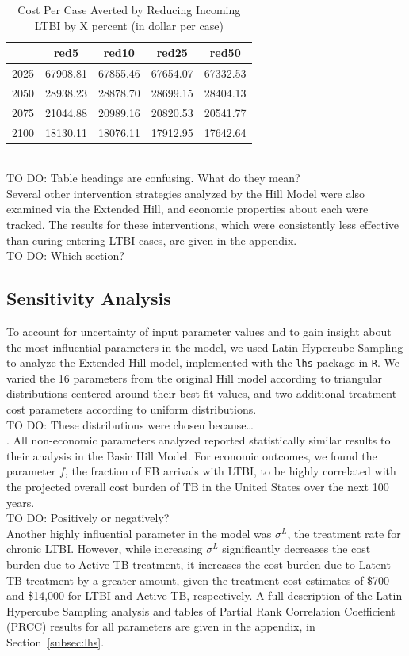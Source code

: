 \documentclass{amsart}
\newcommand{\TODO}[1]{\hfill\\{\huge \color{red} TO DO:} #1 \hfill \\}
\begin{document}
\begin{table}
\centering
\begin{tabular}{|r|cccc|} \hline
       & red5     & red10    & red25    & red50    \\ \hline
  2025 & 67908.81 & 67855.46 & 67654.07 & 67332.53 \\ 
  2050 & 28938.23 & 28878.70 & 28699.15 & 28404.13 \\ 
  2075 & 21044.88 & 20989.16 & 20820.53 & 20541.77 \\ 
  2100 & 18130.11 & 18076.11 & 17912.95 & 17642.64 \\ \hline
\end{tabular}
\caption{Cost Per Case Averted by Reducing Incoming LTBI by X percent (in dollar per case)} 
\label{tab:cpcaArt}
\end{table}
\TODO{Table headings are confusing. What do they mean?}

Several other intervention strategies analyzed by the Hill Model were also
examined via the Extended Hill, and economic properties about each were tracked.
The results for these interventions, which were consistently less effective than
curing entering LTBI cases, are given in the appendix. 
\TODO{Which section?}

\subsection{Sensitivity Analysis}
To account for uncertainty of input parameter values and to gain insight about
the most influential parameters in the model, we used Latin Hypercube Sampling
to analyze the Extended Hill model, implemented with the \texttt{lhs} package in
\texttt{R}.  We varied the 16 parameters from the original Hill model according
to triangular distributions centered around their best-fit values, and two
additional treatment cost parameters according to uniform distributions.
\TODO{These distributions were chosen because\ldots}. 
All non-economic parameters analyzed reported statistically similar results to
their analysis in the Basic Hill Model. For economic outcomes, we found the
parameter $f$, the fraction of FB arrivals with LTBI, to be highly correlated
with the projected overall cost burden of TB in the United States over the next
100 years.
\TODO{Positively or negatively?}
Another highly influential parameter in the model was $\sigma^{L}$,
the treatment rate for chronic LTBI.  However, while increasing $\sigma^{L}$
significantly decreases the cost burden due to Active TB treatment, it increases
the cost burden due to Latent TB treatment by a greater amount, given the
treatment cost estimates of \$700 and \$14,000 for LTBI and Active TB,
respectively.  A full description of the Latin Hypercube Sampling analysis and
tables of Partial Rank Correlation Coefficient (PRCC) results for all parameters
are given in the appendix, in Section~\ref{subsec:lhs}.
\end{document}
